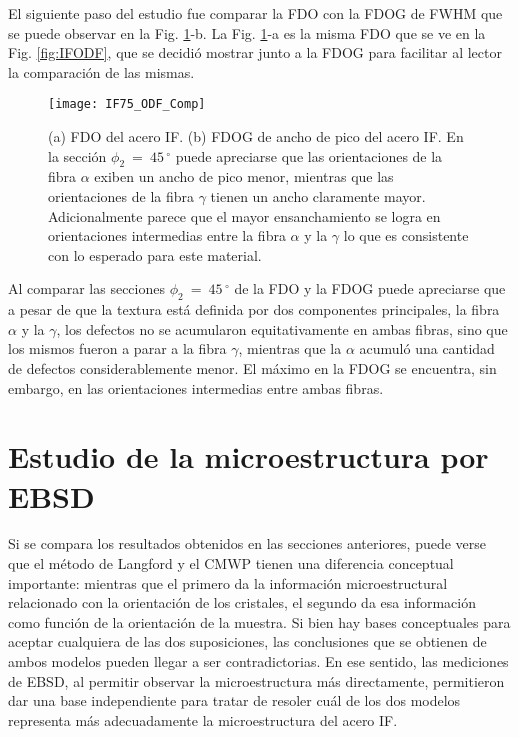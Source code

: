 El siguiente paso del estudio fue comparar la FDO con la FDOG de FWHM que se puede observar en la Fig. \ref{fig:IFODFComp}-b.
La Fig. \ref{fig:IFODFComp}-a es la misma FDO que se ve en la Fig. \ref{fig:IFODF}, que se decidió mostrar junto a la FDOG para facilitar al lector la comparación de las mismas.
\begin{figure}[!htb]
  \centering
  \texttt{[image: IF75\_ODF\_Comp]}
  \caption{(a) FDO del acero IF. (b) FDOG de ancho de pico del acero IF. En la sección $\phi_2 \ = \ 45$\,$^{\circ}$ puede apreciarse que las orientaciones de la fibra $\alpha$ exiben un ancho de pico menor, mientras que las orientaciones de la fibra $\gamma$ tienen un ancho claramente mayor. Adicionalmente parece que el mayor ensanchamiento se logra en orientaciones intermedias entre la fibra $\alpha$ y la $\gamma$ lo que es consistente con lo esperado para este material.}
  \label{fig:IFODFComp}
\end{figure}

Al comparar las secciones $\phi_2 \ = \ 45$\,$^{\circ}$ de la FDO y la FDOG puede apreciarse que a pesar de que la textura está definida por dos componentes principales, la fibra $\alpha$ y  la $\gamma$, los defectos no se acumularon equitativamente en ambas fibras, sino que los mismos fueron a parar a la fibra $\gamma$, mientras que la $\alpha$ acumuló una cantidad de defectos considerablemente menor.
El máximo en la FDOG se encuentra, sin embargo, en las orientaciones intermedias entre ambas fibras.

\newpage
\section{Estudio de la microestructura por EBSD}\label{S:IFEBSD}
Si se compara los resultados obtenidos en las secciones anteriores, puede verse que el método de Langford y el CMWP tienen una diferencia conceptual importante: mientras que el primero da la información microestructural relacionado con la orientación de los cristales, el segundo da esa información como función de la orientación de la muestra.
Si bien hay bases conceptuales para aceptar cualquiera de las dos suposiciones, las conclusiones que se obtienen de ambos modelos pueden llegar a ser contradictorias.
En ese sentido, las mediciones de EBSD, al permitir observar la microestructura más directamente, permitieron dar una base independiente para tratar de resoler cuál de los dos modelos representa más adecuadamente la microestructura del acero IF.

